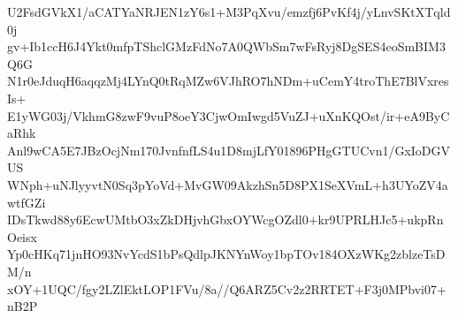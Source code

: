 U2FsdGVkX1/aCATYaNRJEN1zY6s1+M3PqXvu/emzfj6PvKf4j/yLnvSKtXTqld0j
gv+Ib1ccH6J4Ykt0mfpTShclGMzFdNo7A0QWbSm7wFsRyj8DgSES4eoSmBIM3Q6G
N1r0eJduqH6aqqzMj4LYnQ0tRqMZw6VJhRO7hNDm+uCemY4troThE7BlVxresIs+
E1yWG03j/VkhmG8zwF9vuP8oeY3CjwOmIwgd5VuZJ+uXnKQOst/ir+eA9ByCaRhk
Anl9wCA5E7JBzOcjNm170JvnfnfLS4u1D8mjLfY01896PHgGTUCvn1/GxIoDGVUS
WNph+uNJlyyvtN0Sq3pYoVd+MvGW09AkzhSn5D8PX1SeXVmL+h3UYoZV4awtfGZi
IDsTkwd88y6EcwUMtbO3xZkDHjvhGbxOYWcgOZdl0+kr9UPRLHJc5+ukpRnOeisx
Yp0cHKq71jnHO93NvYcdS1bPsQdlpJKNYnWoy1bpTOv184OXzWKg2zblzeTsDM/n
xOY+1UQC/fgy2LZlEktLOP1FVu/8a//Q6ARZ5Cv2z2RRTET+F3j0MPbvi07+nB2P
